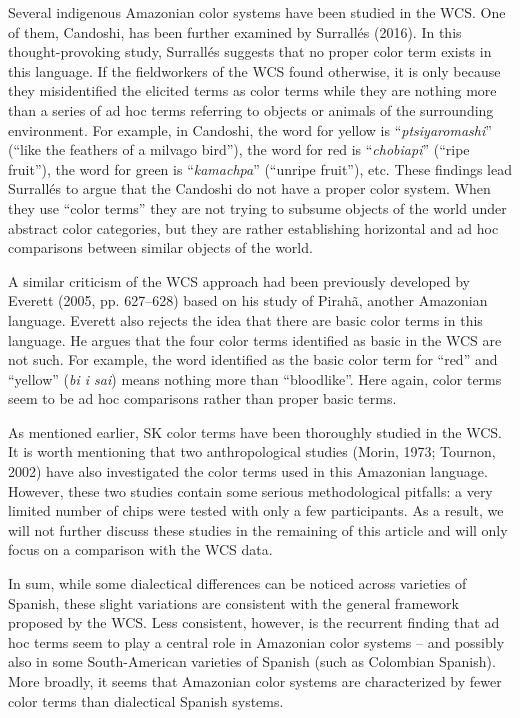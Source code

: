 \documentclass[
  english,
  ,man,floatsintext]{apa6}
\begin{document}
Several indigenous Amazonian color systems have been studied in the WCS. One of them, Candoshi, has been further examined by Surrallés (2016). In this thought-provoking study, Surrallés suggests that no proper color term exists in this language. If the fieldworkers of the WCS found otherwise, it is only because they misidentified the elicited terms as color terms while they are nothing more than a series of ad hoc terms referring to objects or animals of the surrounding environment. For example, in Candoshi, the word for yellow is \enquote{\emph{ptsiyaromashi}} (\enquote{like the feathers of a milvago bird}), the word for red is \enquote{\emph{chobiapi}} (\enquote{ripe fruit}), the word for green is \enquote{\emph{kamachpa}} (\enquote{unripe fruit}), etc. These findings lead Surrallés to argue that the Candoshi do not have a proper color system. When they use \enquote{color terms} they are not trying to subsume objects of the world under abstract color categories, but they are rather establishing horizontal and ad hoc comparisons between similar objects of the world.

A similar criticism of the WCS approach had been previously developed by Everett (2005, pp. 627--628) based on his study of Pirahã, another Amazonian language. Everett also rejects the idea that there are basic color terms in this language. He argues that the four color terms identified as basic in the WCS are not such. For example, the word identified as the basic color term for \enquote{red} and \enquote{yellow} (\emph{bi i sai}) means nothing more than \enquote{bloodlike}. Here again, color terms seem to be ad hoc comparisons rather than proper basic terms.

As mentioned earlier, SK color terms have been thoroughly studied in the WCS. It is worth mentioning that two anthropological studies (Morin, 1973; Tournon, 2002) have also investigated the color terms used in this Amazonian language. However, these two studies contain some serious methodological pitfalls: a very limited number of chips were tested with only a few participants. As a result, we will not further discuss these studies in the remaining of this article and will only focus on a comparison with the WCS data.

In sum, while some dialectical differences can be noticed across varieties of Spanish, these slight variations are consistent with the general framework proposed by the WCS. Less consistent, however, is the recurrent finding that ad hoc terms seem to play a central role in Amazonian color systems -- and possibly also in some South-American varieties of Spanish (such as Colombian Spanish). More broadly, it seems that Amazonian color systems are characterized by fewer color terms than dialectical Spanish systems.
\end{document}
